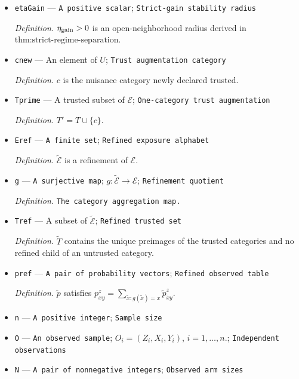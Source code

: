 \documentclass{article}
\begin{document}
\begin{itemize}
  \par\smallskip\noindent\emph{Definition.} \(p^{\rm gain}\) is the strictly tightening three-category table in the strict-regime construction.
  \item \texttt{etaGain} --- \texttt{A positive scalar}; \texttt{Strict-\allowbreak{}gain stability radius}
  \par\smallskip\noindent\emph{Definition.} \(\eta_{\rm gain}>0\) is an open-neighborhood radius derived in \(\text{thm:strict-regime-separation}\).
  \item \texttt{cnew} --- An element of \(U\); \texttt{Trust augmentation category}
  \par\smallskip\noindent\emph{Definition.} \(c\) is the nuisance category newly declared trusted.
  \item \texttt{Tprime} --- A trusted subset of \(\mathcal E\); \texttt{One-\allowbreak{}category trust augmentation}
  \par\smallskip\noindent\emph{Definition.} \(T'=T\cup\{c\}\).
  \item \texttt{Eref} --- \texttt{A finite set}; \texttt{Refined exposure alphabet}
  \par\smallskip\noindent\emph{Definition.} \(\widetilde{\mathcal E}\) is a refinement of \(\mathcal E\).
  \item \texttt{g} --- \texttt{A surjective map}; \(g:\widetilde{\mathcal E}\to\mathcal E\); \texttt{Refinement quotient}
  \par\smallskip\noindent\emph{Definition.} \texttt{The category aggregation map.}
  \item \texttt{Tref} --- A subset of \(\widetilde{\mathcal E}\); \texttt{Refined trusted set}
  \par\smallskip\noindent\emph{Definition.} \(\widetilde T\) contains the unique preimages of the trusted categories and no refined child of an untrusted category.
  \item \texttt{pref} --- \texttt{A pair of probability vectors}; \texttt{Refined observed table}
  \par\smallskip\noindent\emph{Definition.} \(\widetilde p\) satisfies \(p^z_{xy}=\sum_{\tilde x:g(\tilde x)=x}\widetilde p^z_{\tilde x y}\).
  \item \texttt{n} --- \texttt{A positive integer}; \texttt{Sample size}
  \item \texttt{O} --- \texttt{An observed sample}; \(O_i=(Z_i,X_i,Y_i)\), \(i=1,\ldots,n\).; \texttt{Independent observations}
  \item \texttt{N} --- \texttt{A pair of nonnegative integers}; \texttt{Observed arm sizes}

\end{itemize}
\end{document}
